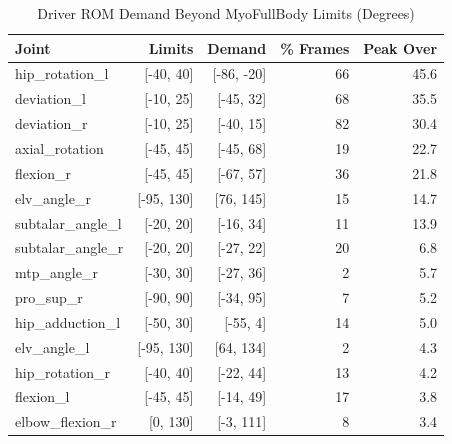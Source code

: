 \documentclass[11pt,a4paper]{article}
\begin{document}
\begin{table}[h]\centering\small
\caption{Driver ROM Demand Beyond MyoFullBody Limits (Degrees)}
\begin{tabular}{lrrrr}\toprule Joint & Limits & Demand & \% Frames & Peak Over \\\midrule
hip\_rotation\_l & [-40, 40] & [-86, -20] & 66 & 45.6 \\
deviation\_l & [-10, 25] & [-45, 32] & 68 & 35.5 \\
deviation\_r & [-10, 25] & [-40, 15] & 82 & 30.4 \\
axial\_rotation & [-45, 45] & [-45, 68] & 19 & 22.7 \\
flexion\_r & [-45, 45] & [-67, 57] & 36 & 21.8 \\
elv\_angle\_r & [-95, 130] & [76, 145] & 15 & 14.7 \\
subtalar\_angle\_l & [-20, 20] & [-16, 34] & 11 & 13.9 \\
subtalar\_angle\_r & [-20, 20] & [-27, 22] & 20 & 6.8 \\
mtp\_angle\_r & [-30, 30] & [-27, 36] & 2 & 5.7 \\
pro\_sup\_r & [-90, 90] & [-34, 95] & 7 & 5.2 \\
hip\_adduction\_l & [-50, 30] & [-55, 4] & 14 & 5.0 \\
elv\_angle\_l & [-95, 130] & [64, 134] & 2 & 4.3 \\
hip\_rotation\_r & [-40, 40] & [-22, 44] & 13 & 4.2 \\
flexion\_l & [-45, 45] & [-14, 49] & 17 & 3.8 \\
elbow\_flexion\_r & [0, 130] & [-3, 111] & 8 & 3.4 \\
\bottomrule\end{tabular}\end{table}
\end{document}
